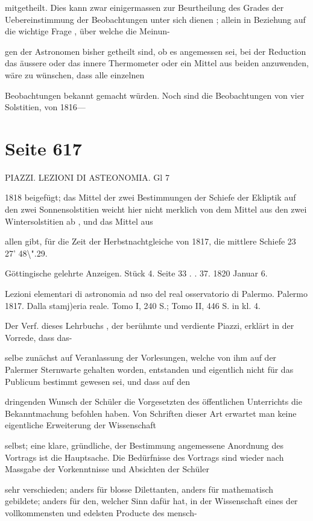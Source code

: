 \documentclass[10pt,a4paper]{article}
\begin{document}
mitgetheilt. Dies kann zwar einigermassen zur Beurtheilung des Grades der Uebereinstimmung der Beobachtungen unter sich dienen ; allein in Beziehung auf die wichtige Frage , über welche die Meinun-

gen der Astronomen bisher getheilt sind, ob es angemessen sei, bei der Reduction das äussere oder das innere Thermometer oder ein Mittel aus beiden anzuwenden, wäre zu wünschen, dass alle einzelnen

Beobachtungen bekannt gemacht würden. Noch sind die Beobachtungen von vier Solstitien, von 1816—


\newpage
\section*{Seite 617}
PIAZZI. LEZIONI DI ASTEONOMIA. Gl 7

1818 beigefügt; das Mittel der zwei Bestimmungen der Schiefe der Ekliptik auf den zwei Sonnensolstitien weicht hier nicht merklich von dem Mittel aus den zwei Wintersolstitien ab , und das Mittel aus

allen gibt, für die Zeit der Herbstnachtgleiche von 1817, die mittlere Schiefe 23\textdegree{} 27' 48\textbackslash{}".29.

Göttingische gelehrte Anzeigen. Stück 4. Seite 33 . . 37. 1820 Januar 6.

Lezioni elementari di astronomia ad nso del real osservatorio di Palermo. Palermo 1817. Dalla stamj)eria reale. Tomo I, 240 S.; Tomo II, 446 S. in kl. 4.

Der Verf. dieses Lehrbuchs , der berühmte und verdiente Piazzi, erklärt in der Vorrede, dass das-

selbe zunächst auf Veranlassung der Vorlesungen, welche von ihm auf der Palermer Sternwarte gehalten worden, entstanden und eigentlich nicht für das Publicum bestimmt gewesen sei, und dass auf den

dringenden Wunsch der Schüler die Vorgesetzten des öffentlichen Unterrichts die Bekanntmachung befohlen haben. Von Schriften dieser Art erwartet man keine eigentliche Erweiterung der Wissenschaft

selbst; eine klare, gründliche, der Bestimmung angemessene Anordnung des Vortrags ist die Hauptsache. Die Bedürfnisse des Vortrags sind wieder nach Massgabe der Vorkenntnisse und Absichten der Schüler

sehr verschieden; anders für blosse Dilettanten, anders für mathematisch gebildete; anders für den, welcher Sinn dafür hat, in der Wissenschaft eines der vollkommensten und edelsten Producte des mensch-
\end{document}
